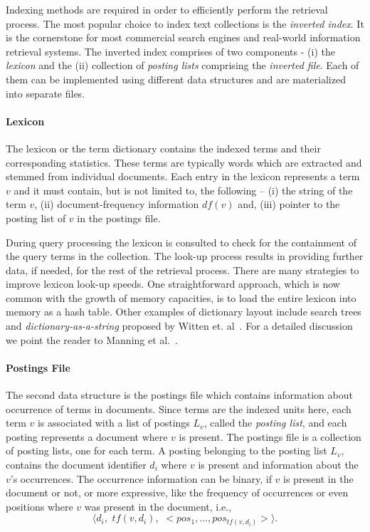 Indexing methods are required in order to efficiently perform the retrieval process. The most popular choice to index text collections is the \emph{inverted index}. It is the cornerstone for most commercial search engines and real-world information retrieval systems.  The inverted index comprises of two components - (i) the \emph{lexicon} and the (ii) collection of \emph{posting lists} comprising the \emph{inverted file}. Each of them can be implemented using different data structures and are materialized into separate files.

\paragraph{Lexicon} The lexicon or the term dictionary contains the indexed terms and their corresponding statistics. These terms are 
typically words which are extracted and stemmed from individual documents. Each entry in the lexicon represents a term $v$ and it must contain, but is not limited to, the following -- (i) the string of the term $v$, (ii) document-frequency information $df(v)$ and, (iii) pointer to the posting list of $v$ in the postings file. 

During query processing the lexicon is consulted to check for the containment of the query terms in the collection. The look-up process results in providing further data, if needed, for the rest of the retrieval process. There are many strategies to improve lexicon look-up speeds. One straightforward approach, which is now common with the growth of memory capacities, is to load the entire lexicon into memory as a hash table. Other examples of dictionary layout include search trees and \emph{dictionary-as-a-string} proposed by Witten et. al~\cite{Witten:1999fk}. For a detailed discussion we point the reader to Manning et al.~\cite{Manning:2008fk}.

\paragraph{Postings File} 

The second data structure is the postings file which contains information about occurrence of terms in documents. Since terms are the indexed units here, each term $v$ is associated with a list of postings $L_v$, called the \emph{posting list}, and each posting represents a document where $v$ is present. The postings file is a collection of posting lists, one for each term. A posting belonging to the posting list $L_v$, contains the document identifier $d_i$ where $v$ is present and information about the $v$'s occurrences. The occurrence information can be binary, if $v$ is present in the document or not, or more expressive, like the frequency of occurrences or even positions where $v$ was present in the document, i.e.,
$$
	\langle d_i,\,\, tf(v,d_i), \,\, <pos_1, \ldots, pos_{tf(v, d_i)}> \rangle.
$$

